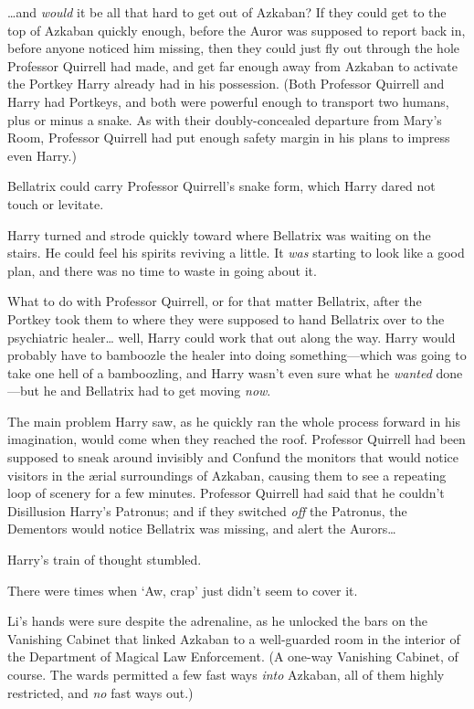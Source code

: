 {\ldots}and \emph{would} it be all that hard to get out of Azkaban? If they could get to the top of Azkaban quickly enough, before the Auror was supposed to report back in, before anyone noticed him missing, then they could just fly out through the hole Professor Quirrell had made, and get far enough away from Azkaban to activate the Portkey Harry already had in his possession. (Both Professor Quirrell and Harry had Portkeys, and both were powerful enough to transport two humans, plus or minus a snake. As with their doubly-concealed departure from Mary's Room, Professor Quirrell had put enough safety margin in his plans to impress even Harry.)

Bellatrix could carry Professor Quirrell's snake form, which Harry dared not touch or levitate.

Harry turned and strode quickly toward where Bellatrix was waiting on the stairs. He could feel his spirits reviving a little. It \emph{was} starting to look like a good plan, and there was no time to waste in going about it.

What to do with Professor Quirrell, or for that matter Bellatrix, after the Portkey took them to where they were supposed to hand Bellatrix over to the psychiatric healer{\ldots} well, Harry could work that out along the way. Harry would probably have to bamboozle the healer into doing something—which was going to take one hell of a bamboozling, and Harry wasn't even sure what he \emph{wanted} done—but he and Bellatrix had to get moving \emph{now}.

The main problem Harry saw, as he quickly ran the whole process forward in his imagination, would come when they reached the roof. Professor Quirrell had been supposed to sneak around invisibly and Confund the monitors that would notice visitors in the ærial surroundings of Azkaban, causing them to see a repeating loop of scenery for a few minutes. Professor Quirrell had said that he couldn't Disillusion Harry's Patronus; and if they switched \emph{off} the Patronus, the Dementors would notice Bellatrix was missing, and alert the Aurors{\ldots}

Harry's train of thought stumbled.

There were times when `Aw, crap' just didn't seem to cover it.

\later

Li's hands were sure despite the adrenaline, as he unlocked the bars on the Vanishing Cabinet that linked Azkaban to a well-guarded room in the interior of the Department of Magical Law Enforcement. (A one-way Vanishing Cabinet, of course. The wards permitted a few fast ways \emph{into} Azkaban, all of them highly restricted, and \emph{no} fast ways out.)


